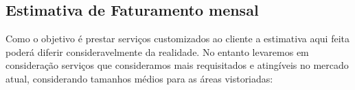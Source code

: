 \subsection{Estimativa de Faturamento mensal}

Como o objetivo é prestar serviços customizados ao cliente a estimativa aqui feita poderá diferir consideravelmente da realidade. No entanto levaremos em consideração serviços que consideramos mais requisitados e atingíveis no mercado atual, considerando tamanhos médios para as áreas vistoriadas:


\begin{table}[h]
	\centering
	\caption{Faturamento mensal}
	\label{faturamentoMensal}
\end{table}


